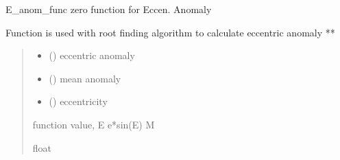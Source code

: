 \documentclass[letterpaper,10pt,english]{sphinxmanual}
\begin{document}
\begin{fulllineitems}
\label{\detokenize{models:pyraa.models.E_anom_func}}
\pysigstartsignatures
{}
\pysigstopsignatures
\sphinxAtStartPar
E\_anom\_func \sphinxhyphen{} zero function for Eccen. Anomaly

\sphinxAtStartPar
Function is used with root finding algorithm to calculate eccentric anomaly
**
\begin{quote}\begin{description}
\begin{itemize}
\item {} 
\sphinxAtStartPar
{} () \sphinxhyphen{}\sphinxhyphen{} eccentric anomaly

\item {} 
\sphinxAtStartPar
{} () \sphinxhyphen{}\sphinxhyphen{} mean anomaly

\item {} 
\sphinxAtStartPar
{} () \sphinxhyphen{}\sphinxhyphen{} eccentricity

\end{itemize}

\sphinxAtStartPar
{} \sphinxhyphen{}\sphinxhyphen{} function value, E \sphinxhyphen{} e*sin(E) \sphinxhyphen{} M

\sphinxAtStartPar
float

\end{description}\end{quote}

\end{fulllineitems}

\end{document}
